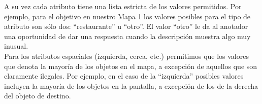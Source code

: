 A su vez cada atributo tiene una lista estricta de los valores permitidos. Por ejemplo, para el objetivo en nuestro Mapa 1 los valores posibles para el tipo de atributo son s\'olo dos: ``restaurante'' u ``otro''. El valor ``otro'' le da al anotador una oportunidad de dar una respuesta cuando la descripci\'on muestra algo muy inusual.\\


Para los atributos espaciales (izquierda, cerca, etc.) permitimos que los valores que denota la mayor\'{i}a de los objetos en el mapa, a excepci\'on de aquellos que son claramente ilegales. Por ejemplo, en el caso de la ``izquierda'' posibles valores incluyen la mayor\'{i}a de los objetos en la pantalla, a excepci\'on de los de la derecha del objeto de destino.
%






